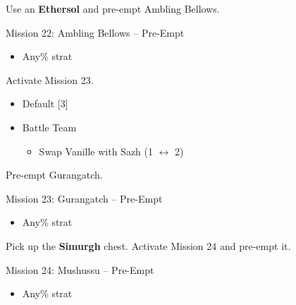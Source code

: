 Use an \textbf{Ethersol} and pre-empt Ambling Bellows.

\begin{battle}{Mission 22: Ambling Bellows -- Pre-Empt}
	\begin{itemize}
		\item Any\% strat
	\end{itemize}
\end{battle}

Activate Mission 23.

\begin{menu}
	\begin{itemize}
		\paradigm
		\begin{itemize}
			\item Default [3]
			\item Battle Team
				\begin{itemize}
					\item Swap Vanille with Sazh (1 $\leftrightarrow$ 2)
				\end{itemize}						      			      	
		\end{itemize}
	\end{itemize}
\end{menu}

Pre-empt Gurangatch.

\begin{battle}{Mission 23: Gurangatch -- Pre-Empt}
	\begin{itemize}
		\item Any\% strat
	\end{itemize}
\end{battle}

Pick up the \textbf{Simurgh} chest.
Activate Mission 24 and pre-empt it.

\begin{battle}{Mission 24: Mushussu -- Pre-Empt}
	\begin{itemize}
		\item Any\% strat
	\end{itemize}
\end{battle}
\vfill

